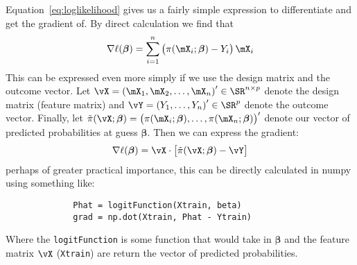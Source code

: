 \documentclass[10pt]{article}
\begin{document}
Equation~\eqref{eq:loglikelihood} gives us a fairly simple expression to differentiate and get the gradient of. By direct calculation we find that 
\begin{equation}
	\label{eq:ellGrad}
	\nabla \ell(\boldsymbol{\beta}) = \sum_{i=1}^n \left(\pi(\mX_i; \boldsymbol{\beta}) - Y_i\right)\mX_i
\end{equation}
This can be expressed even more simply if we use the design matrix and the outcome vector. Let \(\vX = \left(\mX_1, \mX_2, \dots, \mX_n\right)' \in \SR^{n \times p}\) denote the design matrix (feature matrix) and \(\vY = \left(Y_1, \dots, Y_n\right)' \in \SR^p\) denote the outcome vector. Finally, let \(\tilde{\pi}(\vX;\boldsymbol{\beta}) = \left(\pi(\mX_i;\boldsymbol{\beta}),\dots, \pi(\mX_n;\boldsymbol{\beta})\right)'\) denote our vector of predicted probabilities at guess \(\boldsymbol{\beta}\). Then we can express the gradient: 
\begin{equation}
	\label{eq:matGrad}
	\nabla \ell(\boldsymbol{\beta}) = \vX\cdot\left[\tilde\pi(\vX;\boldsymbol{\beta}) - \vY\right]
\end{equation}
perhaps of greater practical importance, this can be directly calculated in numpy using something like:
\begin{figure}[h!]
	\centering
	\begin{BVerbatim}
		Phat = logitFunction(Xtrain, beta)
		grad = np.dot(Xtrain, Phat - Ytrain)
	\end{BVerbatim}
\end{figure}

Where the \verb|logitFunction| is some function that would take in \(\boldsymbol{\beta}\) and the feature matrix \(\vX\) (\verb|Xtrain|) are return the vector of predicted probabilities.
\end{document}
